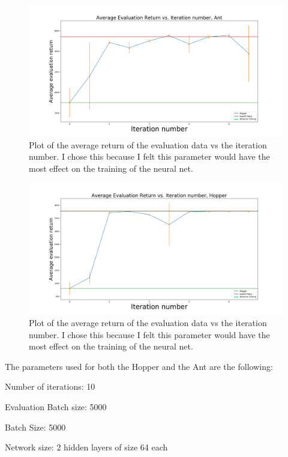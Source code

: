 \documentclass{article}
\begin{document}
\begin{figure}[H]
  \centering
  \includegraphics[width=1\linewidth]{irl_ass1_2.1_ant.png}
  \caption{Plot of the average return of the evaluation data vs the iteration number. I chose this because I felt this parameter would have the most effect on the training of the neural net.}
  \label{fig:1.3}
\end{figure}

\begin{figure}[H]
  \centering
  \includegraphics[width=1\linewidth]{irl_ass1_2.1_hopper.png}
  \caption{Plot of the average return of the evaluation data vs the iteration number. I chose this because I felt this parameter would have the most effect on the training of the neural net.}
  \label{fig:1.3}
\end{figure}

The parameters used for both the Hopper and the Ant are the following:

Number of iterations: 10

Evaluation Batch size: 5000

Batch Size: 5000

Network size: 2 hidden layers of size 64 each
\end{document}
